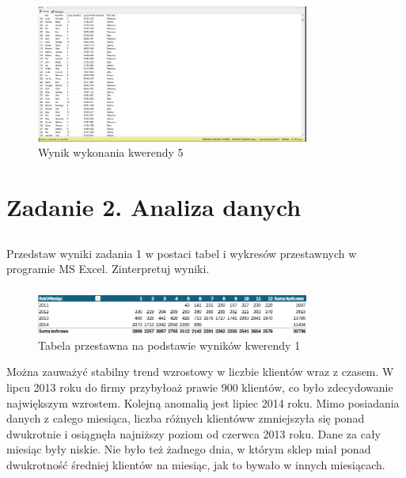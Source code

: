 \documentclass[a4paper,12pt]{article}
\begin{document}
\begin{figure}[H]
    \centering
    \includegraphics[width=0.8\textwidth]{images/05.png}
    \caption{Wynik wykonania kwerendy 5}
\end{figure}

\section{Zadanie 2. Analiza danych}

\subsection{}

Przedstaw wyniki zadania 1 w postaci tabel i wykresów przestawnych w programie MS Excel. Zinterpretuj wyniki.

\subsubsection{}

\begin{figure}[H]
    \centering
    \includegraphics[width=0.8\textwidth]{images/excel/01.png}
    \caption{Tabela przestawna na podstawie wyników kwerendy 1}
\end{figure}

Można zauważyć stabilny trend wzrostowy w liczbie klientów wraz z czasem. W lipcu 2013 roku do firmy przybyłoaż prawie 900 klientów, co było zdecydowanie największym wzrostem. Kolejną anomalią jest lipiec 2014 roku. Mimo posiadania danych z całego miesiąca, liczba różnych klientóww zmniejszyła się ponad dwukrotnie i osiągnęła najniższy poziom od czerwca 2013 roku. Dane za cały miesiąc były niskie. Nie było też żadnego dnia, w którym sklep miał ponad dwukrotność średniej klientów na miesiąc, jak to bywało w innych miesiącach.
\end{document}
